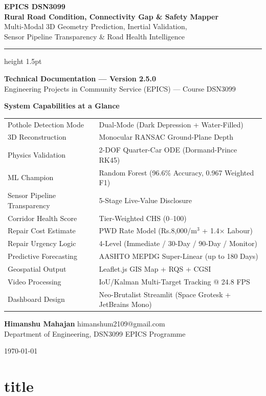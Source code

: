 \documentclass[11pt,a4paper]{report}
\begin{document}
\begin{titlepage}
\centering
\vspace*{2cm}
{\LARGE\bfseries EPICS DSN3099\\[0.4em]
Rural Road Condition, Connectivity Gap \& Safety Mapper\\[0.6em]}
{\large Multi-Modal 3D Geometry Prediction, Inertial Validation,\\
Sensor Pipeline Transparency \& Road Health Intelligence}

\vspace{1.5cm}
\hrule height 1.5pt
\vspace{0.6cm}

{\large\bfseries Technical Documentation --- Version 2.5.0}\\[0.4em]
{\normalsize Engineering Projects in Community Service (EPICS) --- Course DSN3099}

\vspace{1cm}
\begin{tcolorbox}[colback=gray!5, colframe=gray!60, width=0.88\textwidth, arc=2mm]
\centering
\textbf{System Capabilities at a Glance}\\[6pt]
\small
\begin{tabular}{ll}
Pothole Detection Mode & Dual-Mode (Dark Depression + Water-Filled) \\
3D Reconstruction & Monocular RANSAC Ground-Plane Depth \\
Physics Validation & 2-DOF Quarter-Car ODE (Dormand-Prince RK45) \\
ML Champion & Random Forest (96.6\% Accuracy, 0.967 Weighted F1) \\
Sensor Pipeline Transparency & 5-Stage Live-Value Disclosure \\
Corridor Health Score & Tier-Weighted CHS (0--100) \\
Repair Cost Estimate & PWD Rate Model (Rs.8,000/m$^3$ + 1.4$\times$ Labour) \\
Repair Urgency Logic & 4-Level (Immediate / 30-Day / 90-Day / Monitor) \\
Predictive Forecasting & AASHTO MEPDG Super-Linear (up to 180 Days) \\
Geospatial Output & Leaflet.js GIS Map + RQS + CGSI \\
Video Processing & IoU/Kalman Multi-Target Tracking @ 24.8 FPS \\
Dashboard Design & Neo-Brutalist Streamlit (Space Grotesk + JetBrains Mono) \\
\end{tabular}
\end{tcolorbox}

\vspace{1.5cm}
{\normalsize\textbf{Himanshu Mahajan} \quad himanshum2109@gmail.com}\\[0.3em]
{\normalsize Department of Engineering, DSN3099 EPICS Programme}

\vfill
{\small\today}
\part{title}\end{titlepage}
\end{document}
